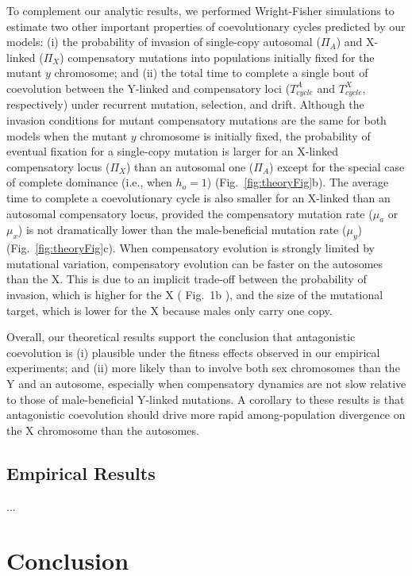 \documentclass{article}
\newcommand\hl[1]{%
  \bgroup
  \hskip0pt\color{blue!80!black}%
  #1%
  \egroup
}
\begin{document}
To complement our analytic results, we performed Wright-Fisher simulations to estimate two other important properties of coevolutionary cycles predicted by our models: (i) the probability of invasion of single-copy autosomal ($\Pi_A$) and X-linked ($\Pi_X$) compensatory mutations into populations initially fixed for the mutant $y$ chromosome; and (ii) the total time to complete a single bout of coevolution between the Y-linked and compensatory loci ($T^{A}_{cycle}$ and $T^{X}_{cycle}$, respectively) under recurrent mutation, selection, and drift. Although the invasion conditions for mutant compensatory mutations are the same for both models when the mutant $y$ chromosome is initially fixed, the probability of eventual fixation for a single-copy mutation is larger for an X-linked compensatory locus ($\Pi_X$) than an autosomal one ($\Pi_A$) except for the special case of complete dominance (i.e., when $h_o = 1$) (Fig.~\ref{fig:theoryFig}b). The average time to complete a coevolutionary cycle is also smaller for an X-linked than an autosomal compensatory locus, provided the compensatory mutation rate ($\mu_a$ or $\mu_x$) is not dramatically lower than the male-beneficial mutation rate ($\mu_y$) (Fig.~\ref{fig:theoryFig}c). When compensatory evolution is strongly limited by mutational variation, compensatory evolution can be faster on the autosomes than the X. This is due to an implicit trade-off between the probability of invasion, which is higher for the X (\hl{Fig.~1b}), and the size of the mutational target, which is lower for the X because males only carry one copy.

Overall, our theoretical results support the conclusion that antagonistic coevolution is (i) plausible under the fitness effects observed in our empirical experiments; and (ii) more likely than to involve both sex chromosomes than the Y and an autosome, especially when compensatory dynamics are not slow relative to those of male-beneficial Y-linked mutations. A corollary to these results is that antagonistic coevolution should drive more rapid among-population divergence on the X chromosome than the autosomes.


\subsection{Empirical Results} \label{subsec:EmpirRes}

...


\section{Conclusion} \label{sec:Conclusion}
\end{document}

